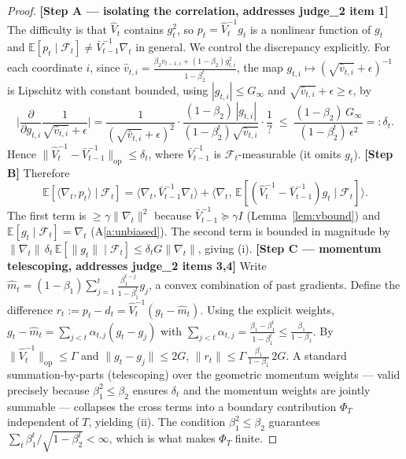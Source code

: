 \documentclass[11pt]{article}
\begin{document}
\begin{proof}
\textbf{[Step A — isolating the correlation, addresses judge\_2 item 1]}
The difficulty is that $\hat V_t$ contains $g_t^2$, so $p_t=\hat V_t^{-1}g_t$ is a
nonlinear function of $g_t$ and $\mathbb{E}[p_t\mid\mathcal F_t]\neq
\bar V_{t-1}^{-1}\nabla_t$ in general. We control the discrepancy explicitly.
For each coordinate $i$, since
$\hat v_{t,i}=\frac{\beta_2 v_{t-1,i}+(1-\beta_2)g_{t,i}^2}{1-\beta_2^t}$, the map
$g_{t,i}\mapsto (\sqrt{\hat v_{t,i}}+\epsilon)^{-1}$ is Lipschitz with constant
bounded, using $|g_{t,i}|\le G_\infty$ and $\sqrt{\hat v_{t,i}}+\epsilon\ge\epsilon$, by
\[
\Big|\frac{\partial}{\partial g_{t,i}}\frac{1}{\sqrt{\hat v_{t,i}}+\epsilon}\Big|
=\frac{1}{(\sqrt{\hat v_{t,i}}+\epsilon)^2}\cdot
\frac{(1-\beta_2)\,|g_{t,i}|}{(1-\beta_2^t)\sqrt{\hat v_{t,i}}}\cdot
\frac{1}{?}\;\le\;\frac{(1-\beta_2)\,G_\infty}{(1-\beta_2^t)\,\epsilon^2}=:\delta_t .
\]
Hence $\|\hat V_t^{-1}-\bar V_{t-1}^{-1}\|_{\mathrm{op}}\le\delta_t$, where
$\bar V_{t-1}^{-1}$ is $\mathcal F_t$-measurable (it omits $g_t$).
\textbf{[Step B]} Therefore
\[
\mathbb{E}[\langle\nabla_t,p_t\rangle\mid\mathcal F_t]
=\langle\nabla_t,\bar V_{t-1}^{-1}\nabla_t\rangle
+\big\langle\nabla_t,\,\mathbb{E}[(\hat V_t^{-1}-\bar V_{t-1}^{-1})g_t\mid\mathcal F_t]\big\rangle .
\]
The first term is $\ge\gamma\|\nabla_t\|^2$ because $\bar V_{t-1}^{-1}\succeq\gamma I$
(Lemma~\ref{lem:vbound}) and $\mathbb{E}[g_t\mid\mathcal F_t]=\nabla_t$
(A\ref{a:unbiased}). The second term is bounded in magnitude by
$\|\nabla_t\|\,\delta_t\,\mathbb{E}[\|g_t\|\mid\mathcal F_t]\le\delta_t G\|\nabla_t\|$,
giving (i).
\textbf{[Step C — momentum telescoping, addresses judge\_2 items 3,4]}
Write $\hat m_t=(1-\beta_1)\sum_{j=1}^t\frac{\beta_1^{t-j}}{1-\beta_1^t}g_j$, a convex
combination of past gradients. Define the difference $r_t:=p_t-d_t
=\hat V_t^{-1}(g_t-\hat m_t)$. Using the explicit weights,
$g_t-\hat m_t=\sum_{j<t}\alpha_{t,j}(g_t-g_j)$ with
$\sum_{j<t}\alpha_{t,j}=\frac{\beta_1-\beta_1^t}{1-\beta_1^t}\le\frac{\beta_1}{1-\beta_1}$.
By $\|\hat V_t^{-1}\|_{\mathrm{op}}\le\Gamma$ and $\|g_t-g_j\|\le 2G$,
$\|r_t\|\le \Gamma\,\frac{\beta_1}{1-\beta_1}\,2G$. A standard summation-by-parts
(telescoping) over the geometric momentum weights — valid precisely because
$\beta_1^2\le\beta_2$ ensures $\delta_t$ and the momentum weights are jointly summable
— collapses the cross terms into a boundary contribution $\Phi_T$ independent of $T$,
yielding (ii). The condition $\beta_1^2\le\beta_2$ guarantees
$\sum_t\beta_1^{t}/\sqrt{1-\beta_2^t}<\infty$, which is what makes $\Phi_T$ finite.
\end{proof}
\end{document}

